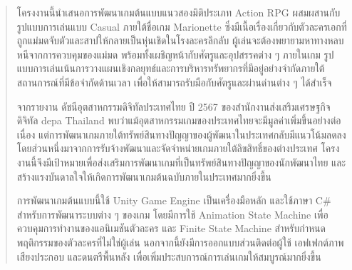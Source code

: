 \maketitle
\makesignature

\ifproject
\begin{abstract}

โครงงานนี้นำเสนอการพัฒนาเกมต้นแบบแนวสองมิติประเภท Action RPG ผสมผสานกับรูปแบบการเล่นแบบ Casual ภายใต้ชื่อเกม Marionette ซึ่งมีเนื้อเรื่องเกี่ยวกับตัวละครเอกที่ถูกแม่มดจับตัวและสาปให้กลายเป็นหุ่นเชิดในโรงละครลึกลับ ผู้เล่นจะต้องพยายามหาทางหลบหนีจากการควบคุมของแม่มด พร้อมทั้งเผชิญหน้ากับศัตรูและอุปสรรคต่าง ๆ ภายในเกม รูปแบบการเล่นเน้นการวางแผนเชิงกลยุทธ์และการบริหารทรัพยากรที่มีอยู่อย่างจำกัดภายใต้สถานการณ์ที่มีข้อจำกัดด้านเวลา เพื่อให้สามารถรับมือกับศัตรูและผ่านด่านต่าง ๆ ได้สำเร็จ

จากรายงาน ดัชนีอุตสาหกรรมดิจิทัลประเทศไทย ปี 2567 ของสำนักงานส่งเสริมเศรษฐกิจดิจิทัล depa Thailand พบว่าแม้อุตสาหกรรมเกมของประเทศไทยจะมีมูลค่าเพิ่มขึ้นอย่างต่อเนื่อง แต่การพัฒนาเกมภายใต้ทรัพย์สินทางปัญญาของผู้พัฒนาในประเทศกลับมีแนวโน้มลดลง โดยส่วนหนึ่งมาจากการรับจ้างพัฒนาและจัดจำหน่ายเกมภายใต้ลิขสิทธิ์ของต่างประเทศ โครงงานนี้จึงมีเป้าหมายเพื่อส่งเสริมการพัฒนาเกมที่เป็นทรัพย์สินทางปัญญาของนักพัฒนาไทย และสร้างแรงบันดาลใจให้เกิดการพัฒนาเกมต้นฉบับภายในประเทศมากยิ่งขึ้น

การพัฒนาเกมต้นแบบนี้ใช้ Unity Game Engine เป็นเครื่องมือหลัก และใช้ภาษา C\# สำหรับการพัฒนาระบบต่าง ๆ ของเกม โดยมีการใช้ Animation State Machine เพื่อควบคุมการทำงานของแอนิเมชันตัวละคร และ Finite State Machine สำหรับกำหนดพฤติกรรมของตัวละครที่ไม่ใช่ผู้เล่น นอกจากนี้ยังมีการออกแบบส่วนติดต่อผู้ใช้ เอฟเฟกต์ภาพ เสียงประกอบ และดนตรีพื้นหลัง เพื่อเพิ่มประสบการณ์การเล่นเกมให้สมบูรณ์มากยิ่งขึ้น

\end{abstract}

